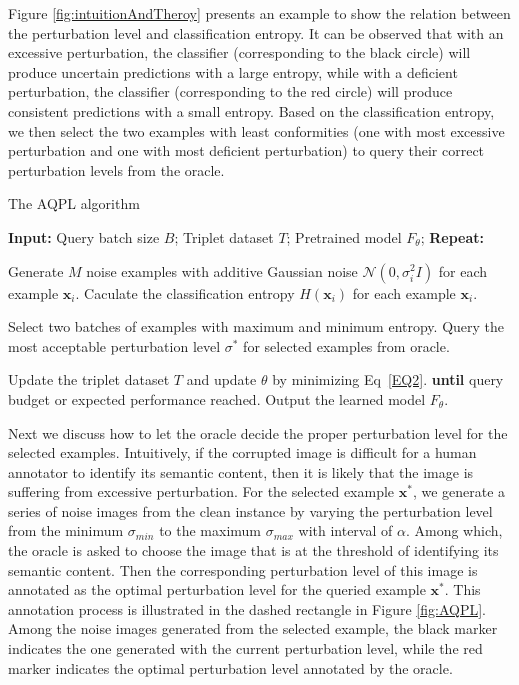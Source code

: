 \documentclass[letterpaper]{article} %
\begin{document}
Figure \ref{fig:intuitionAndTheroy} presents an example to show the relation between the perturbation level and classification entropy. It can be observed that with an excessive perturbation, the classifier (corresponding to the black circle) will produce uncertain predictions with a large entropy, while with a deficient perturbation, the classifier (corresponding to the red circle) will produce consistent predictions with a small entropy. Based on the classification entropy, we then select the two examples with least conformities (one with most excessive perturbation and one with most deficient perturbation) to query their correct perturbation levels from the oracle.

\begin{algorithm}[t]

\caption{The AQPL algorithm}
\label{alg:AQPL}
\begin{algorithmic}[1]
\STATE \textbf{Input:}
\STATE \quad Query batch size $B$;
\STATE \quad Triplet dataset $T$;
\STATE \quad Pretrained model $F_\theta$;
\STATE \textbf{Repeat:}

\STATE \quad Generate $M$ noise examples with additive Gaussian noise $\mathcal{N}(0,\sigma_i^2 I)$ for each example $\mathbf{x}_i$.
\STATE \quad Caculate the classification entropy $H(\mathbf{x}_i)$ for each example $\mathbf{x}_i$.

\STATE \quad Select two batches of examples with maximum and minimum entropy.
\STATE \quad Query the most acceptable perturbation level $\sigma^*$ for selected examples from oracle.


\STATE \quad Update the triplet dataset $T$ and update $\theta$ by minimizing Eq~\ref{EQ2}.
\STATE \textbf{until} query budget or expected performance reached.
\STATE Output the learned model $F_\theta$.

\end{algorithmic}
\end{algorithm}

Next we discuss how to let the oracle decide the proper perturbation level for the selected examples. Intuitively, if the corrupted image is difficult for a human annotator to identify its semantic content, then it is likely that the image is suffering from excessive perturbation. For the selected example $\mathbf{x}^*$, we generate a series of noise images from the clean instance by varying the perturbation level from the minimum $\sigma_{min}$ to the maximum $\sigma_{max}$ with interval of $\alpha$. Among which, the oracle is asked to choose the image that is at the threshold of identifying its semantic content. Then the corresponding perturbation level of this image is annotated as the optimal perturbation level for the queried example $\mathbf{x}^*$. This annotation process is illustrated in the dashed rectangle in Figure \ref{fig:AQPL}. Among the noise images generated from the selected example, the black marker indicates the one generated with the current perturbation level, while the red marker indicates the optimal perturbation level annotated by the oracle.
\end{document}
